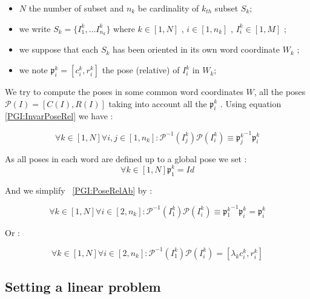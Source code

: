 %

\begin{itemize}
    \item  $N$  the number of  subset  and $n_k$ be cardinality of $k_{th}$ subset $S_k$;
    \item  we write $S_k =\{I^k_1,\dots I^k_{n_k}\} $  where $k \in [1,N]$ , $ i \in [1,n_k]$ , $ I^k_i \in [1 , M] $ ;
    \item   we suppose that each $S_k$ has been oriented in its own word coordinate $W_k$ ;
    \item   we note $\mathfrak{p}^k_i=[c^k_i, r^k_i]$ the pose (relative) of $I^k_i$ in $W_k$;
\end{itemize}

We try to compute the poses in some common word coordinates $W$, all the poses $\mathcal{P}(I)=[C(I),R(I)]$
taking into account all the  $\mathfrak{p}^k_i$  .  Using equation \ref{PGI:InvarPoseRel}
we have :

\begin{equation}
     \forall k \in [1,N]   \forall i,j \in [1,n_k]  :
     \mathcal{P}^{-1}(I^k_j)  \mathcal{P}(I^k_i)  \equiv  \mathfrak{p}{^k_j}^{-1} \mathfrak{p}^k_i 
   \label{PGI:PoseRelAb}
\end{equation}

As all poses in each word are defined up to a global pose we set :
\begin{equation}
     \forall k \in [1,N]   
      \mathfrak{p}^k_1  = Id
   \label{PGI:FirstPoseId}
\end{equation}

And we  simplify ~\ref{PGI:PoseRelAb}  by :

\begin{equation}
     \forall k \in [1,N]   \forall i \in [2,n_k]  :
         \mathcal{P}^{-1}(I^k_1)  \mathcal{P}(I^k_i)  \equiv   \mathfrak{p}{^k_1}^{-1} \mathfrak{p}^k_i   =\mathfrak{p}^k_i 
   \label{PGI:PoseRelAb2}
\end{equation}

Or :

\begin{equation}
     \forall k \in [1,N]   \forall i \in [2,n_k]  :
         \mathcal{P}^{-1}(I^k_1)  \mathcal{P}(I^k_i) = [\lambda_k c^k_i, r^k_i]
   \label{PGI:PoseRelAb2}
\end{equation}


\subsection{Setting  a linear problem}

